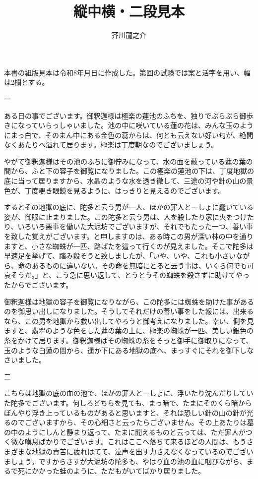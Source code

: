\documentclass[tate,twocolumn,book,paper=a4]{jlreq}
\title{縦中横・二段見本}
\author{芥川龍之介}
\begin{document}
\maketitle
本書の組版見本は令和8年月日に作成した。第回の試験では案と\tatechuyoko{12pt}活字を用い、幅は2欄とする。\par
一\par
ある日の事でございます。御釈迦様は極楽の蓮池のふちを、独りでぶらぶら御歩きになっていらっしゃいました。池の中に咲いている蓮の花は、みんな玉のようにまっ白で、そのまん中にある金色の蕊からは、何とも云えない好い匂が、絶間なくあたりへ溢れて居ります。極楽は丁度朝なのでございましょう。\par
やがて御釈迦様はその池のふちに御佇みになって、水の面を蔽っている蓮の葉の間から、ふと下の容子を御覧になりました。この極楽の蓮池の下は、丁度地獄の底に当って居りますから、水晶のような水を透き徹して、三途の河や針の山の景色が、丁度覗き眼鏡を見るように、はっきりと見えるのでございます。\par
するとその地獄の底に、陀多と云う男が一人、ほかの罪人と一しょに蠢いている姿が、御眼に止まりました。この陀多と云う男は、人を殺したり家に火をつけたり、いろいろ悪事を働いた大泥坊でございますが、それでもたった一つ、善い事を致した覚えがございます。と申しますのは、ある時この男が深い林の中を通りますと、小さな蜘蛛が一匹、路ばたを這って行くのが見えました。そこで陀多は早速足を挙げて、踏み殺そうと致しましたが、「いや、いや、これも小さいながら、命のあるものに違いない。その命を無暗にとると云う事は、いくら何でも可哀そうだ。」と、こう急に思い返して、とうとうその蜘蛛を殺さずに助けてやったからでございます。\par
御釈迦様は地獄の容子を御覧になりながら、この陀多には蜘蛛を助けた事があるのを御思い出しになりました。そうしてそれだけの善い事をした報には、出来るなら、この男を地獄から救い出してやろうと御考えになりました。幸い、側を見ますと、翡翠のような色をした蓮の葉の上に、極楽の蜘蛛が一匹、美しい銀色の糸をかけて居ります。御釈迦様はその蜘蛛の糸をそっと御手に御取りになって、玉のような白蓮の間から、遥か下にある地獄の底へ、まっすぐにそれを御下しなさいました。\par
二\par
こちらは地獄の底の血の池で、ほかの罪人と一しょに、浮いたり沈んだりしていた陀多でございます。何しろどちらを見ても、まっ暗で、たまにそのくら暗からぼんやり浮き上っているものがあると思いますと、それは恐しい針の山の針が光るのでございますから、その心細さと云ったらございません。その上あたりは墓の中のようにしんと静まり返って、たまに聞えるものと云っては、ただ罪人がつく微な嘆息ばかりでございます。これはここへ落ちて来るほどの人間は、もうさまざまな地獄の責苦に疲れはてて、泣声を出す力さえなくなっているのでございましょう。ですからさすが大泥坊の陀多も、やはり血の池の血に咽びながら、まるで死にかかった蛙のように、ただもがいてばかり居りました。\par
\end{document}
